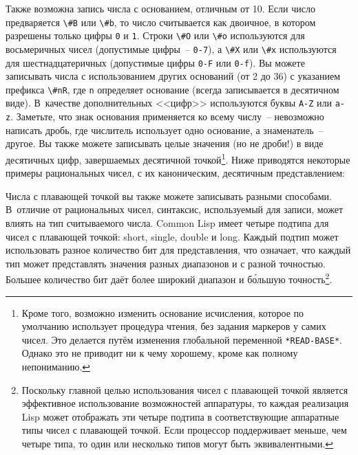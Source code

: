 Также возможна запись числа с основанием, отличным от 10.  Если число предваряется
\lstinline{\#B} или \lstinline{\#b}, то число считывается как двоичное, в котором разрешены только
цифры \lstinline{0} и \lstinline{1}.  Строки \lstinline{\#O} или \lstinline{\#o} используются для восьмеричных
чисел (допустимые цифры~-- \lstinline{0-7}), а \lstinline{\#X} или \lstinline{\#x} используются для
шестнадцатеричных (допустимые цифры \lstinline{0-F} или \lstinline{0-f}).  Вы можете записывать
числа с использованием других оснований (от 2 до 36) с указанием префикса \lstinline{\#nR}, где
\lstinline{n} определяет основание (всегда записывается в десятичном виде).  В~качестве
дополнительных <<цифр>> используются буквы \lstinline{A-Z} или \lstinline{a-z}.  Заметьте, что знак
основания применяется ко всему числу~-- невозможно написать дробь, где числитель
использует одно основание, а знаменатель~-- другое.  Вы также можете записывать целые
значения (но не дроби!) в виде десятичных цифр, завершаемых десятичной
точкой\footnote{Кроме того, возможно изменить основание исчисления, которое по умолчанию
  использует процедура чтения, без задания маркеров у самих чисел. Это делается путём
  изменения глобальной переменной \lstinline{*READ-BASE*}.  Однако это не приводит ни к чему
  хорошему, кроме как полному непониманию.}.  Ниже приводятся некоторые примеры
рациональных чисел, с их каноническим, десятичным представлением:


Числа с плавающей точкой вы также можете записывать разными способами.  В~отличие от
рациональных чисел, синтаксис, используемый для записи, может влиять на тип считываемого
числа.  Common Lisp имеет четыре подтипа для чисел с пла\-ваю\-щей точкой: short, single,
double и long.  Каждый подтип может использовать разное количество бит для представления,
что означает, что каждый тип может представлять значения разных диапазонов и с разной
точностью.  Большее количество бит даёт более широкий диапазон и б\'{о}льшую
точность\footnote{Поскольку главной целью использования чисел с плавающей точкой является
  эффективное использование возможностей аппаратуры, то каждая реализация Lisp может
  отображать эти четыре подтипа в соответствующие аппаратные типы чисел с плавающей
  точкой.  Если процессор поддерживает меньше, чем четыре типа, то один или несколько
  типов могут быть эквивалентными.}.

